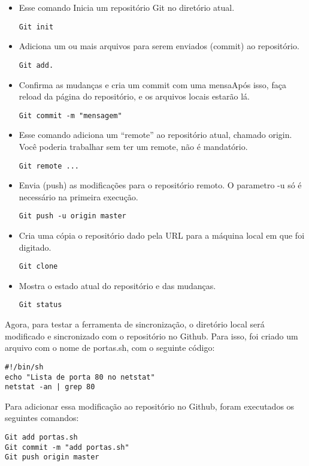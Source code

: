 \begin{itemize}
    \item Esse comando Inicia um repositório Git no 
    diretório atual.
	\begin{lstlisting}
Git init
	\end{lstlisting}
    \item Adiciona um ou mais arquivos para serem 
    enviados (commit) ao repositório.
	\begin{lstlisting}
Git add.
	\end{lstlisting}
    \item Confirma as mudanças e 
    cria um commit com uma mensaApós isso, faça reload da 
    página do repositório, e os arquivos locais estarão lá.
	\begin{lstlisting}
Git commit -m "mensagem"
	\end{lstlisting}    
    \item Esse comando adiciona um “remote” 
    ao repositório atual, chamado origin. Você poderia trabalhar 
    sem ter um remote, não é mandatório.
	\begin{lstlisting}
Git remote ...
	\end{lstlisting}
    \item Envia (push) as modificações 
    para o repositório remoto. O parametro -u só é necessário na 
    primeira execução.
	\begin{lstlisting}
Git push -u origin master
	\end{lstlisting}
    \item Cria uma cópia o repositório dado pela URL 
    para a máquina local em que foi digitado.
	\begin{lstlisting}
Git clone
	\end{lstlisting}
    \item Mostra o estado atual do repositório e 
    das mudanças.
	\begin{lstlisting}
Git status
	\end{lstlisting}
\end{itemize}
Agora, para testar a ferramenta de sincronização, o diretório 
local será modificado e sincronizado com o repositório no Github. 
Para isso, foi criado um arquivo com o nome de portas.sh, 
com o seguinte código:
    \begin{lstlisting}
#!/bin/sh
echo "Lista de porta 80 no netstat"
netstat -an | grep 80
    \end{lstlisting}
 Para adicionar essa modificação ao repositório no Github, 
 foram executados os seguintes comandos:
     \begin{lstlisting}
Git add portas.sh
Git commit -m "add portas.sh"
Git push origin master
    \end{lstlisting}

